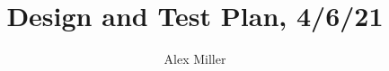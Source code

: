 \documentclass[]{article}
\title{Design and Test Plan, 4/6/21}
\author{Alex Miller}
\begin{document}
	\maketitle

\begin{abstract}

\end{abstract}

\section{}
\end{document}
